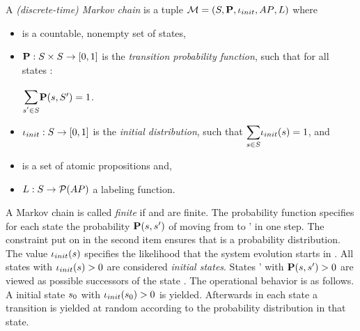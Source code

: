 \documentclass[preview]{standalone}
\begin{document}
\begin{definition}
	A \emph{(discrete-time) Markov chain} is a tuple ${\mathcal{M}} = ({S}, {\textbf{P}}, {\iota_{init}}, {AP}, {L})$ where 
	\begin{itemize}
		\item \states is a countable, nonempty set of states,
		\item ${\textbf{P}} : {S} \times {S} \to [0,1]$ is the \emph{transition probability function}, such that for all states \state:
		\begin{center}
			$\bbigsum{\state' \in \states}\probtfunc(\state,\states') = 1$.	
		\end{center}
		\item ${\iota_{init}} : {S} \to [0,1]$ is the \emph{initial distribution}, such that $\mathlarger{\sum_{\state \in \states}} \initdistrib(\state) = 1$, and
		\item \atomicprops is a set of atomic propositions and,
		\item ${L} : {S} \to {\mathcal{P}(\ensuremath{{AP}})}$ a labeling function.		
	\end{itemize}
\end{definition}
A Markov chain \autm is called \emph{finite} if \states and \atomicprops are finite. 
The probability function \probtfunc specifies for each state \state the probability ${\textbf{P}}({s},{s}')$ of moving from \state to \state' in one step. The constraint put on \probtfunc in the second item ensures that \probtfunc is a probability distribution. The value ${\iota_{init}}({s})$ specifies the likelihood that the system evolution starts in \state. All states \state with ${\iota_{init}}({s}) > 0$ are  considered \emph{initial states}. States \state' with ${\textbf{P}}({s}, {s}') > 0$ are viewed as possible successors of the state \state. The operational behavior is as follows. A initial state ${s}_0$ with ${\iota_{init}}({s}_0) > 0$ is yielded. Afterwards in each state a transition is yielded at random according to the probability distribution \probtfunc in that state. 
\begin{itemize}
\end{itemize}
\end{document}
